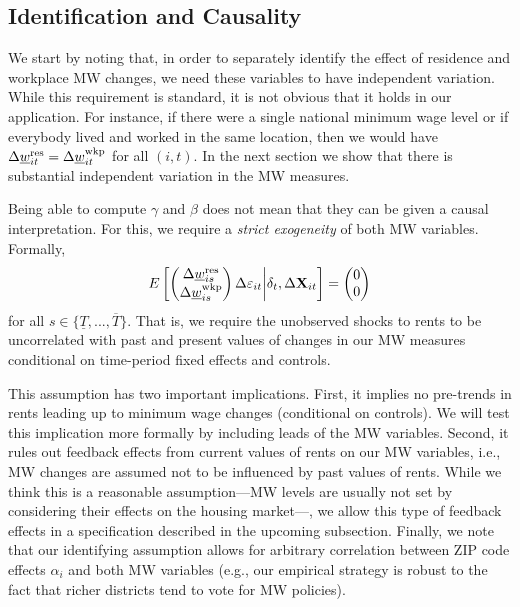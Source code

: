 \subsection{Identification and Causality}

We start by noting that, in order to separately identify the effect of 
residence and workplace MW changes, we need these variables to have independent
variation.
While this requirement is standard, it is not obvious that it holds in our
application.
For instance, if there were a single national minimum wage level or if everybody 
lived and worked in the same location, then we would have
$\Delta \underline{w}^{\text{res}}_{it} = \Delta \underline{w}^{\text{wkp}}_{it}$ for all $(i,t)$.
In the next section we show that there is substantial independent variation
in the MW measures.

Being able to compute $\gamma$ and $\beta$ does not mean that they can be given
a causal interpretation.
For this, we require a \textit{strict exogeneity} of both MW variables.
Formally,
\begin{equation*}\label{eq:strict_exogeneity}
    E\left[
        \begin{pmatrix}
            \Delta \underline{w}^{\text{res}}_{is} \\
            \Delta \underline{w}^{\text{wkp}}_{is} \\
        \end{pmatrix}
        \Delta \varepsilon_{it}
    \bigg| \delta_t, \Delta \mathbf{X}_{it} \right] =
    \begin{pmatrix}
        0 \\
        0 \\
    \end{pmatrix}
\end{equation*}
for all $s\in\{\underline{T}, ..., \overline{T}\}$.
That is, we require the unobserved shocks to rents to be uncorrelated with 
past and present values of changes in our MW measures 
conditional on time-period fixed effects and controls.

This assumption has two important implications.
First,
it implies no pre-trends in rents leading up to minimum wage changes 
(conditional on controls). We will test this implication more formally by 
including leads of the MW variables.
Second,
it rules out feedback effects from current values of rents on our MW variables, 
i.e., MW changes are assumed not to be influenced by past values of rents.
While we think this is a reasonable assumption---MW levels are usually not 
set by considering their effects on the housing market---, we allow this type of 
feedback effects in a specification described in the upcoming subsection.
Finally, we note that our identifying assumption allows for arbitrary 
correlation between ZIP code effects $\alpha_i$ and both MW variables
(e.g., our empirical strategy is robust to the fact that richer districts tend 
to vote for MW policies).


